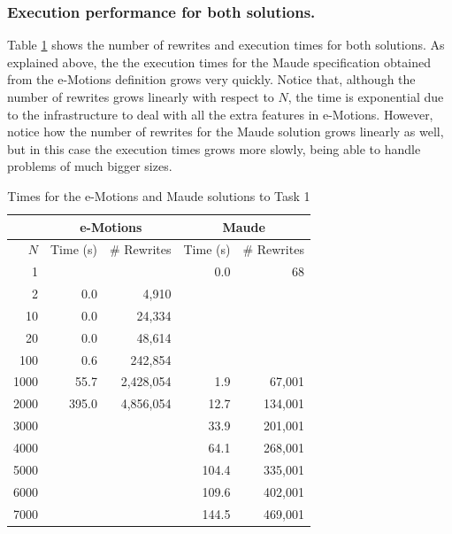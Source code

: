 \subsubsection{Execution performance for both solutions.}

Table \ref{table:task1} shows the number of rewrites and execution times for both solutions. As explained above, the the execution times for the Maude specification obtained from the e-Motions definition grows very quickly. Notice that, although the number of rewrites grows linearly with respect to $N$, the time is exponential due to the infrastructure to deal with all the extra features in e-Motions. However, notice how the number of rewrites for the Maude solution grows linearly as well, but in this case the execution times grows more slowly, being able to handle problems of much bigger sizes.

\begin{table}[tb]
\renewcommand{\tabcolsep}{6pt}
\renewcommand{\arraystretch}{1.2}
	\caption{Times for the e-Motions and Maude solutions to Task 1}
	\label{table:task1}
    \centering
	\begin{tabular}[tb]{r|r|r|r|r|}
	\hline
	    & \multicolumn{2}{|c|}{e-Motions} & \multicolumn{2}{|c|}{Maude} \\
	\hline
	$N$ & Time (s) & \# Rewrites & Time (s) & \# Rewrites \\
	\hline
	1    &       &           & 0.0 &       68 \\
	2    &   0.0 &     4,910 && \\
	10   &   0.0 &    24,334 && \\
	20   &   0.0 &    48,614 && \\
	100  &   0.6 &   242,854 && \\
	1000 &  55.7 & 2,428,054 &   1.9 &  67,001 \\
	2000 & 395.0 & 4,856,054 &  12.7 & 134,001 \\
	3000 &       &           &  33.9 & 201,001 \\
	4000 &       &           &  64.1 & 268,001 \\
	5000 &       &           & 104.4 & 335,001 \\
	6000 &       &           & 109.6 & 402,001 \\
	7000 &       &           & 144.5 & 469,001 \\
	\hline 
	\end{tabular}
	\vspace{1cm}
\end{table}

